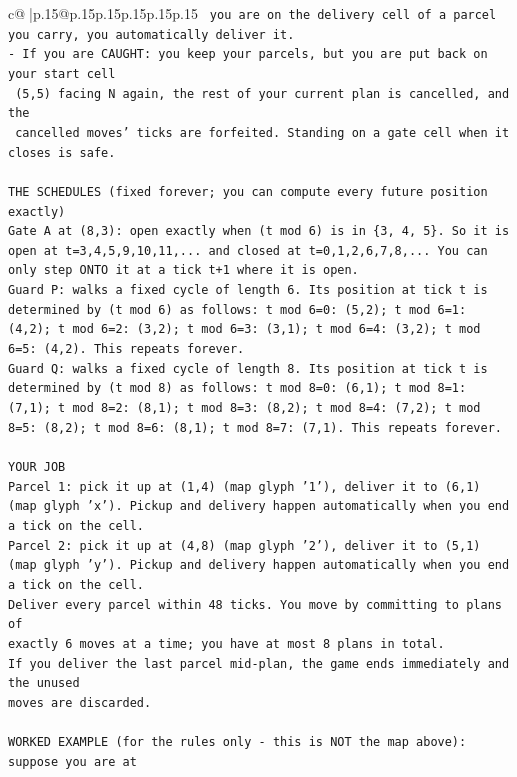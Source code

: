 \documentclass{article}
\begin{document}
{\begin{supertabular}{c@{$\;$}|p{.15\linewidth}@{}p{.15\linewidth}p{.15\linewidth}p{.15\linewidth}p{.15\linewidth}p{.15\linewidth}}
{{{\texttt{     you are on the delivery cell of a parcel you carry, you automatically deliver it.} \\
\texttt{{-} If you are CAUGHT: you keep your parcels, but you are put back on your start cell} \\
\texttt{  (5,5) facing N again, the rest of your current plan is cancelled, and the} \\
\texttt{  cancelled moves' ticks are forfeited. Standing on a gate cell when it closes is safe.} \\
\\ 
\texttt{THE SCHEDULES (fixed forever; you can compute every future position exactly)} \\
\texttt{Gate A at (8,3): open exactly when (t mod 6) is in \{3, 4, 5\}. So it is open at t=3,4,5,9,10,11,... and closed at t=0,1,2,6,7,8,... You can only step ONTO it at a tick t+1 where it is open.} \\
\texttt{Guard P: walks a fixed cycle of length 6. Its position at tick t is determined by (t mod 6) as follows: t mod 6=0: (5,2); t mod 6=1: (4,2); t mod 6=2: (3,2); t mod 6=3: (3,1); t mod 6=4: (3,2); t mod 6=5: (4,2). This repeats forever.} \\
\texttt{Guard Q: walks a fixed cycle of length 8. Its position at tick t is determined by (t mod 8) as follows: t mod 8=0: (6,1); t mod 8=1: (7,1); t mod 8=2: (8,1); t mod 8=3: (8,2); t mod 8=4: (7,2); t mod 8=5: (8,2); t mod 8=6: (8,1); t mod 8=7: (7,1). This repeats forever.} \\
\\ 
\texttt{YOUR JOB} \\
\texttt{Parcel 1: pick it up at (1,4) (map glyph '1'), deliver it to (6,1) (map glyph 'x'). Pickup and delivery happen automatically when you end a tick on the cell.} \\
\texttt{Parcel 2: pick it up at (4,8) (map glyph '2'), deliver it to (5,1) (map glyph 'y'). Pickup and delivery happen automatically when you end a tick on the cell.} \\
\texttt{Deliver every parcel within 48 ticks. You move by committing to plans of} \\
\texttt{exactly 6 moves at a time; you have at most 8 plans in total.} \\
\texttt{If you deliver the last parcel mid{-}plan, the game ends immediately and the unused} \\
\texttt{moves are discarded.} \\
\\ 
\texttt{WORKED EXAMPLE (for the rules only {-} this is NOT the map above): suppose you are at} \\
}}}
\end{supertabular}}
\end{document}
